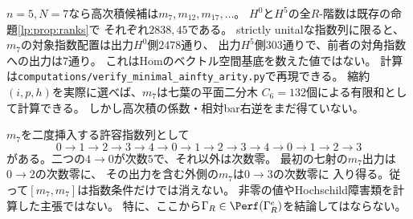 \begin{remark}
$n=5,N=7$なら高次積候補は$m_7,m_{12},m_{17},\ldots$。
$H^0$と$H^5$の全$R$-階数は既存の命題\ref{lp:prop:ranks}で
それぞれ$2838,45$である。
strictly unitalな指数列に限ると、
$m_7$の対象指数配置は出力$H^0$側$2478$通り、
出力$H^5$側$303$通りで、前者の対角指数への出力は$7$通り。
これはHomのベクトル空間基底を数えた値ではない。
計算は\texttt{computations/verify\_minimal\_ainfty\_arity.py}で再現できる。
縮約$(i,p,h)$を実際に選べば、$m_7$は七葉の平面二分木
$C_6=132$個による有限和として計算できる。
しかし高次積の係数・相対bar右逆をまだ得ていない。

$m_7$を二度挿入する許容指数列として
\[
 0\to1\to2\to3\to4\to0\to1\to2\to3
 \to4\to0\to1\to2\to3
\]
がある。二つの$4\to0$が次数$5$で、それ以外は次数零。
最初の七射の$m_7$出力は$0\to2$の次数零に、
その出力を含む外側の$m_7$は$0\to3$の次数零に
入り得る。従って$[m_7,m_7]$は指数条件だけでは消えない。
非零の値やHochschild障害類を計算した主張ではない。
特に、ここから$\Gamma_R\in\Perf(\Gamma_R^e)$を結論してはならない。
\end{remark}
